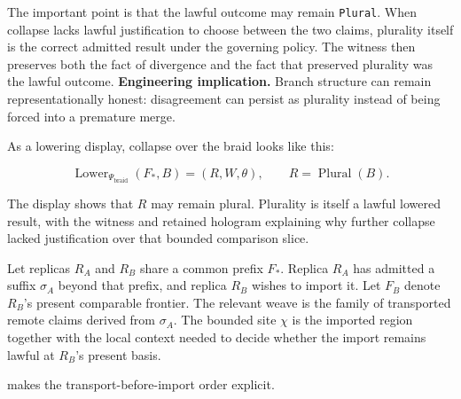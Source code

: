 \documentclass{aion}
\begin{document}
The important point is that the lawful outcome may remain \texttt{Plural}. When
collapse lacks lawful justification to choose between the two claims, plurality
itself is the correct admitted result under the governing policy. The witness
then preserves both the fact of divergence and the fact that preserved plurality
was the lawful outcome. \textbf{Engineering implication.} Branch structure can
remain representationally honest: disagreement can persist as plurality instead
of being forced into a premature merge.

	As a lowering display, collapse over the braid looks like this:

\[
	\operatorname{Lower}_{\Psi_{\mathrm{braid}}}(F_*, B)
	=
	(R, W, \theta),
	\qquad
	R = \operatorname{Plural}(B).
\]

The display shows that \(R\) may remain plural. Plurality is itself a lawful
lowered result, with the witness and retained hologram explaining why further
collapse lacked justification over that bounded comparison slice.


Let replicas \(R_A\) and \(R_B\) share a common prefix \(F_*\). Replica \(R_A\)
has admitted a suffix \(\sigma_A\) beyond that prefix, and replica \(R_B\) wishes
to import it. Let \(F_B\) denote \(R_B\)'s present comparable frontier. The
relevant weave is the family of transported remote claims derived from
\(\sigma_A\). The bounded site \(\chi\) is the imported region together with the
local context needed to decide whether the import remains lawful at \(R_B\)'s
present basis.

 makes the transport-before-import order explicit.
\end{document}
